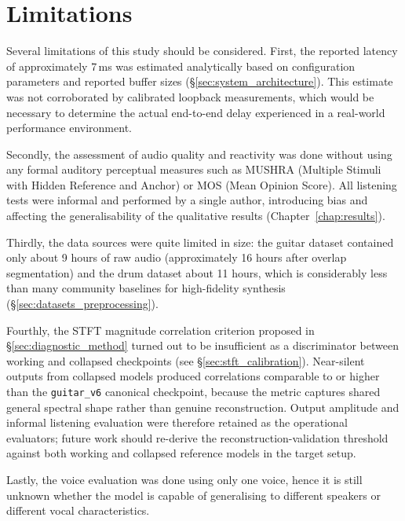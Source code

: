 \documentclass[a4paper,11pt,oneside,openany]{book}
\begin{document}
\section{Limitations}\label{sec:limitations}

Several limitations of this study should be considered. First, the reported latency of approximately 7\,ms was estimated analytically based on configuration parameters and reported buffer sizes (\S\ref{sec:system_architecture}). This estimate was not corroborated by calibrated loopback measurements, which would be necessary to determine the actual end-to-end delay experienced in a real-world performance environment.

Secondly, the assessment of audio quality and reactivity was done without using any formal auditory perceptual measures such as MUSHRA (Multiple Stimuli with Hidden Reference and Anchor) or MOS (Mean Opinion Score). All listening tests were informal and performed by a single author, introducing bias and affecting the generalisability of the qualitative results (Chapter~\ref{chap:results}).

Thirdly, the data sources were quite limited in size: the guitar dataset contained only about 9 hours of raw audio (approximately 16 hours after overlap segmentation) and the drum dataset about 11 hours, which is considerably less than many community baselines for high-fidelity synthesis (\S\ref{sec:datasets_preprocessing}).

Fourthly, the STFT magnitude correlation criterion proposed in \S\ref{sec:diagnostic_method} turned out to be insufficient as a discriminator between working and collapsed checkpoints (see \S\ref{sec:stft_calibration}). Near-silent outputs from collapsed models produced correlations comparable to or higher than the \texttt{guitar\_v6} canonical checkpoint, because the metric captures shared general spectral shape rather than genuine reconstruction. Output amplitude and informal listening evaluation were therefore retained as the operational evaluators; future work should re-derive the reconstruction-validation threshold against both working and collapsed reference models in the target setup.

Lastly, the voice evaluation was done using only one voice, hence it is still unknown whether the model is capable of generalising to different speakers or different vocal characteristics.
\end{document}
